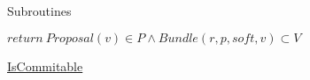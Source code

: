 \documentclass[10pt,a4paper]{article}
\begin{document}
\begin{section}{Subroutines}\label{sect:soubroutines}

\begin{algorithm}[H]
    \begin{algorithmic}[1]

    \State $return \ Proposal(v) \in P \land Bundle(r,p,soft,v) \subset V$

    \EndFunction
    \end{algorithmic}
    \caption{\underline{IsCommitable}}
\end{algorithm}







\end{section}
\end{document}
